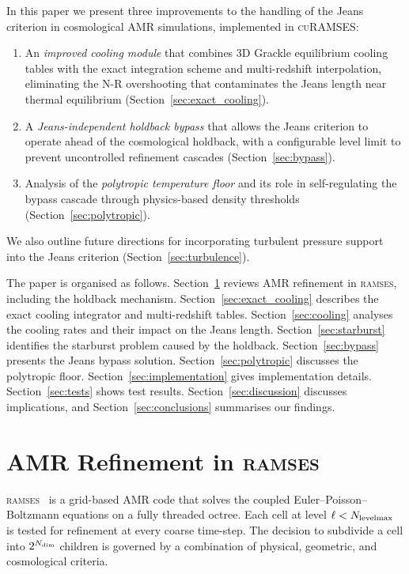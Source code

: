 \documentclass[fleqn,usenatbib]{mnras}
\newcommand{\ramses}{\textsc{ramses}}
\newcommand{\curamses}{\textsc{cuRAMSES}}
\newcommand{\nlevelmax}{N_{\rm levelmax}}
\newcommand{\twotondim}{2^{N_{\rm dim}}}
\begin{document}
In this paper we present three improvements to the handling of the
Jeans criterion in cosmological AMR simulations, implemented in
\curamses:
\begin{enumerate}
  \item An \emph{improved cooling module} that combines 3D Grackle
    equilibrium cooling tables with the \citet{Townsend2009} exact
    integration scheme and multi-redshift interpolation, eliminating
    the N-R overshooting that contaminates the Jeans length near
    thermal equilibrium (Section~\ref{sec:exact_cooling}).
  \item A \emph{Jeans-independent holdback bypass} that allows the
    Jeans criterion to operate ahead of the cosmological holdback,
    with a configurable level limit to prevent uncontrolled refinement
    cascades (Section~\ref{sec:bypass}).
  \item Analysis of the \emph{polytropic temperature floor} and its
    role in self-regulating the bypass cascade through physics-based
    density thresholds (Section~\ref{sec:polytropic}).
\end{enumerate}
We also outline future directions for incorporating turbulent
pressure support into the Jeans criterion
(Section~\ref{sec:turbulence}).

The paper is organised as follows.
Section~\ref{sec:amr_refine} reviews AMR refinement in \ramses,
including the holdback mechanism.
Section~\ref{sec:exact_cooling} describes the exact cooling integrator
and multi-redshift tables.
Section~\ref{sec:cooling} analyses the cooling rates and their impact
on the Jeans length.
Section~\ref{sec:starburst} identifies the starburst problem caused
by the holdback.
Section~\ref{sec:bypass} presents the Jeans bypass solution.
Section~\ref{sec:polytropic} discusses the polytropic floor.
Section~\ref{sec:implementation} gives implementation details.
Section~\ref{sec:tests} shows test results.
Section~\ref{sec:discussion} discusses implications, and
Section~\ref{sec:conclusions} summarises our findings.


\section{AMR Refinement in \ramses}
\label{sec:amr_refine}

\ramses\ \citep{Teyssier2002} is a grid-based AMR code that solves
the coupled Euler--Poisson--Boltzmann equations on a fully threaded
octree.  Each cell at level $\ell < \nlevelmax$ is tested for
refinement at every coarse time-step.  The decision to subdivide a
cell into $\twotondim$ children is governed by a combination of
physical, geometric, and cosmological criteria.
\end{document}
